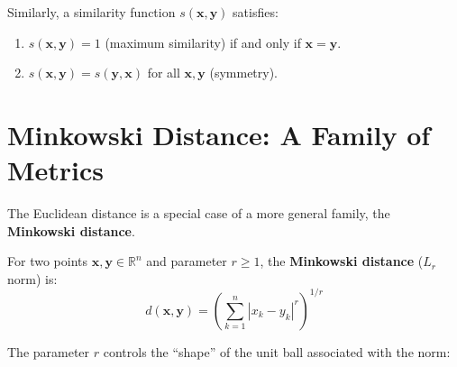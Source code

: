 Similarly, a similarity function $s(\mathbf{x}, \mathbf{y})$ satisfies:
\begin{enumerate}
  \item $s(\mathbf{x}, \mathbf{y}) = 1$ (maximum similarity) if and only if $\mathbf{x} = \mathbf{y}$.
  \item $s(\mathbf{x}, \mathbf{y}) = s(\mathbf{y}, \mathbf{x})$ for all $\mathbf{x}, \mathbf{y}$ (symmetry).
\end{enumerate}

\section{Minkowski Distance: A Family of Metrics}
\label{sec:minkowski}

The Euclidean distance is a special case of a more general family, the \textbf{Minkowski distance}.

\begin{definition}
For two points $\mathbf{x}, \mathbf{y} \in \mathbb{R}^n$ and parameter $r \geq 1$, the \textbf{Minkowski distance} ($L_r$ norm) is:
\begin{equation}
  d(\mathbf{x}, \mathbf{y}) = \left( \sum_{k=1}^{n} |x_k - y_k|^r \right)^{1/r}
  \label{eq:minkowski}
\end{equation}
\end{definition}

The parameter $r$ controls the ``shape'' of the unit ball associated with the norm:

